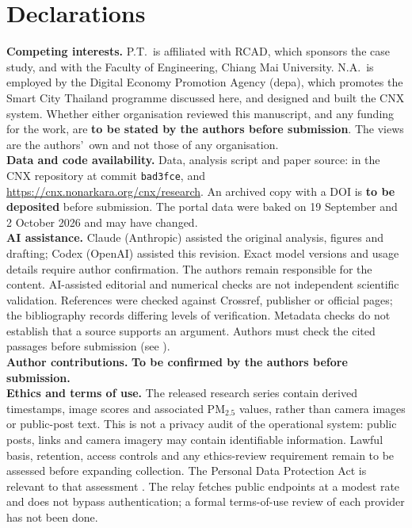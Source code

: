 \documentclass[10pt,twocolumn,a4paper]{article}
\begin{document}
\section*{Declarations}
\small
\textbf{Competing interests.} P.T.\ is affiliated with RCAD, which sponsors the case study, and with the Faculty of Engineering, Chiang Mai University. N.A.\ is employed by the Digital Economy Promotion Agency (depa), which promotes the Smart City Thailand programme discussed here, and designed and built the CNX system. Whether either organisation reviewed this manuscript, and any funding for the work, are \textbf{to be stated by the authors before submission}. The views are the authors\textquoteright\ own and not those of any organisation.\\
\textbf{Data and code availability.} Data, analysis script and paper source:  in the CNX repository at commit \texttt{bad3fce}, and \url{https://cnx.nonarkara.org/cnx/research}. An archived copy with a DOI is \textbf{to be deposited} before submission. The portal data were baked on 19 September and 2 October 2026 and may have changed.\\
\textbf{AI assistance.} Claude (Anthropic) assisted the original analysis, figures and drafting; Codex (OpenAI) assisted this revision. Exact model versions and usage details require author confirmation. The authors remain responsible for the content. AI-assisted editorial and numerical checks are not independent scientific validation. References were checked against Crossref, publisher or official pages; the bibliography records differing levels of verification. Metadata checks do not establish that a source supports an argument. Authors must check the cited passages before submission (see ).\\
\textbf{Author contributions.} \textbf{To be confirmed by the authors before submission.}\\
\textbf{Ethics and terms of use.} The released research series contain derived timestamps, image scores and associated PM$_{2.5}$ values, rather than camera images or public-post text. This is not a privacy audit of the operational system: public posts, links and camera imagery may contain identifiable information. Lawful basis, retention, access controls and any ethics-review requirement remain to be assessed before expanding collection. The Personal Data Protection Act is relevant to that assessment \citep{thailand2019pdpa}. The relay fetches public endpoints at a modest rate and does not bypass authentication; a formal terms-of-use review of each provider has not been done.

{\small}
\end{document}
